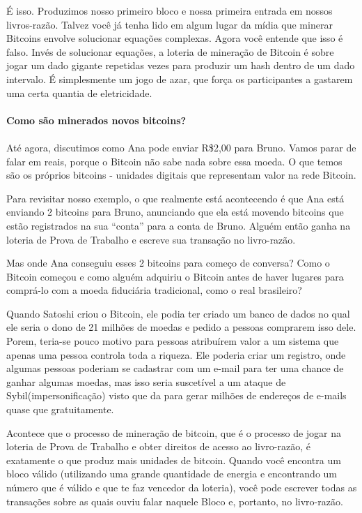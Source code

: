 É isso. Produzimos nosso primeiro bloco e nossa primeira entrada em nossos livros-razão.
Talvez você já tenha lido em algum lugar da mídia que minerar Bitcoins envolve solucionar equações complexas. Agora você entende que isso é falso. Invés de solucionar equações, a loteria de mineração de Bitcoin é sobre jogar um dado gigante repetidas vezes para produzir um hash dentro de um dado intervalo. É simplesmente um jogo de azar, que força os participantes a gastarem uma certa quantia de eletricidade. %

\paragraph{Como são minerados novos bitcoins?}
\paragraph{}

Até agora, discutimos como Ana pode enviar R\$2,00 para Bruno. Vamos parar de falar em reais, porque o Bitcoin não sabe nada sobre essa moeda. O que temos são os próprios bitcoins - unidades digitais que representam valor na rede Bitcoin.

Para revisitar nosso exemplo, o que realmente está acontecendo é que Ana está enviando 2 bitcoins para Bruno, anunciando que ela está movendo bitcoins que estão registrados na sua “conta” para a conta de Bruno. Alguém então ganha na loteria de Prova de Trabalho e escreve sua transação no livro-razão.

Mas onde Ana conseguiu esses 2 bitcoins para começo de conversa? Como o Bitcoin começou e como alguém adquiriu o Bitcoin antes de haver lugares para comprá-lo com a moeda fiduciária tradicional, como o real brasileiro?

Quando Satoshi criou o Bitcoin, ele podia ter criado um banco de dados no qual ele seria o dono de 21 milhões de moedas e pedido a pessoas comprarem isso dele. Porem, teria-se pouco motivo para pessoas atribuírem valor a um sistema que apenas uma pessoa controla toda a riqueza. Ele poderia criar um registro, onde algumas pessoas poderiam se cadastrar com um e-mail para ter uma chance de ganhar algumas moedas, mas isso seria suscetível a um ataque de Sybil(impersonificação) visto que da para gerar milhões de endereços de e-mails quase que gratuitamente.

Acontece que o processo de mineração de bitcoin, que é o processo de jogar na loteria de Prova de Trabalho e obter direitos de acesso ao livro-razão, é exatamente o que produz mais unidades de bitcoin. Quando você encontra um bloco válido (utilizando uma grande quantidade de energia e encontrando um número que é válido e que te faz vencedor da loteria), você pode escrever todas as transações sobre as quais ouviu falar naquele Bloco e, portanto, no livro-razão.

